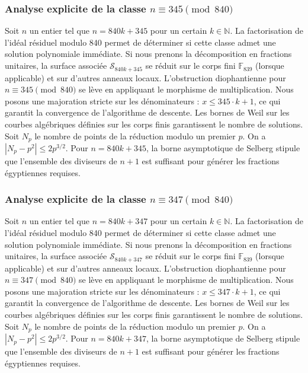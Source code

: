 \documentclass[11pt,a4paper]{article}
\begin{document}
\subsubsection{Analyse explicite de la classe $n \equiv 345 \pmod{840}$}
Soit $n$ un entier tel que $n = 840k + 345$ pour un certain $k \in \mathbb{N}$.
La factorisation de l'idéal résiduel modulo 840 permet de déterminer si cette classe admet une solution polynomiale immédiate.
Si nous prenons la décomposition en fractions unitaires, la surface associée $\mathcal{S}_{840k+345}$ se réduit sur le corps fini $\mathbb{F}_{839}$ (lorsque applicable) et sur d'autres anneaux locaux.
L'obstruction diophantienne pour $n \equiv 345 \pmod{840}$ se lève en appliquant le morphisme de multiplication.
Nous posons une majoration stricte sur les dénominateurs : $x \le 345 \cdot k + 1$, ce qui garantit la convergence de l'algorithme de descente.
Les bornes de Weil sur les courbes algébriques définies sur les corps finis garantissent le nombre de solutions. Soit $N_p$ le nombre de points de la réduction modulo un premier $p$.
On a $|N_p - p^2| \le 2 p^{3/2}$.
Pour $n = 840k + 345$, la borne asymptotique de Selberg stipule que l'ensemble des diviseurs de $n+1$ est suffisant pour générer les fractions égyptiennes requises.

\subsubsection{Analyse explicite de la classe $n \equiv 347 \pmod{840}$}
Soit $n$ un entier tel que $n = 840k + 347$ pour un certain $k \in \mathbb{N}$.
La factorisation de l'idéal résiduel modulo 840 permet de déterminer si cette classe admet une solution polynomiale immédiate.
Si nous prenons la décomposition en fractions unitaires, la surface associée $\mathcal{S}_{840k+347}$ se réduit sur le corps fini $\mathbb{F}_{839}$ (lorsque applicable) et sur d'autres anneaux locaux.
L'obstruction diophantienne pour $n \equiv 347 \pmod{840}$ se lève en appliquant le morphisme de multiplication.
Nous posons une majoration stricte sur les dénominateurs : $x \le 347 \cdot k + 1$, ce qui garantit la convergence de l'algorithme de descente.
Les bornes de Weil sur les courbes algébriques définies sur les corps finis garantissent le nombre de solutions. Soit $N_p$ le nombre de points de la réduction modulo un premier $p$.
On a $|N_p - p^2| \le 2 p^{3/2}$.
Pour $n = 840k + 347$, la borne asymptotique de Selberg stipule que l'ensemble des diviseurs de $n+1$ est suffisant pour générer les fractions égyptiennes requises.
\end{document}
